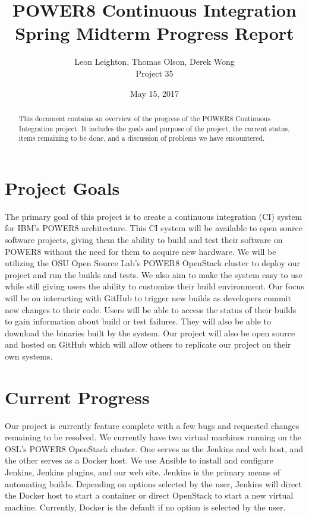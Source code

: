 \documentclass[10pt,onecolumn,journal,draftclsnofoot]{IEEEtran}
\begin{document}
\begin{titlepage}
  \title{POWER8 Continuous Integration\\ Spring Midterm Progress Report}
  \author{Leon Leighton, Thomas Olson, Derek Wong\\Project 35}
  \date{May 15, 2017}
  \maketitle
  \vspace{4cm}
  \begin{abstract}
  \noindent This document contains an overview of the progress of the POWER8 Continuous Integration project.
    It includes the goals and purpose of the project, the current status, items remaining to be done, 
    and a discussion of problems we have encountered. 
 \end{abstract}
\end{titlepage}

\tableofcontents
\clearpage

\section{Project Goals}
The primary goal of this project is to create a continuous integration (CI) system for IBM's POWER8 architecture.
This CI system will be available to open source software projects, giving them the ability to build and test their software on POWER8 without the need for them to acquire new hardware.
We will be utilizing the OSU Open Source Lab's POWER8 OpenStack cluster to deploy our project and run the builds and tests.
We also aim to make the system easy to use while still giving users the ability to customize their build environment.
Our focus will be on interacting with GitHub to trigger new builds as developers commit new changes to their code.
Users will be able to access the status of their builds to gain information about build or test failures.
They will also be able to download the binaries built by the system.
Our project will also be open source and hosted on GitHub which will allow others to replicate our project on their own systems.

\section{Current Progress}
Our project is currently feature complete with a few bugs and requested changes remaining to be resolved.
We currently have two virtual machines running on the OSL's POWER8 OpenStack cluster.
One serves as the Jenkins and web host, and the other serves as a Docker host. 
We use Ansible to install and configure Jenkins, Jenkins plugins, and our web site. 
Jenkins is the primary means of automating builds.
Depending on options selected by the user, Jenkins will direct the Docker host to start a container or direct OpenStack to start
a new virtual machine. 
Currently, Docker is the default if no option is selected by the user.
\end{document}
